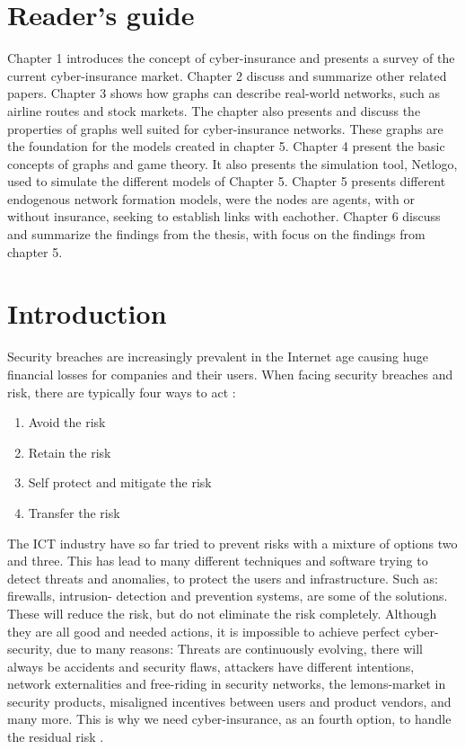 \section{Reader's guide}
Chapter 1 introduces the concept of cyber-insurance and presents a survey of the current cyber-insurance market. Chapter 2 discuss and summarize other related papers. Chapter 3 shows how graphs can describe real-world networks, such as airline routes and stock markets. The chapter also presents and discuss the properties of graphs well suited for cyber-insurance networks. These graphs are the foundation for the models created in chapter 5. Chapter 4 present the basic concepts of graphs and game theory. It also presents the simulation tool, Netlogo, used to simulate the different models of Chapter 5. 
Chapter 5 presents different endogenous network formation models, were the nodes are agents, with or without insurance, seeking to establish links with eachother.  
Chapter 6 discuss and summarize the findings from the thesis, with focus on the findings from chapter 5. 


\section{Introduction}
Security breaches are increasingly prevalent in the Internet age causing huge financial losses
for companies and their users. When facing security breaches and risk, there are typically four ways to act \cite{bolot2008new}:
\begin{enumerate}
\item Avoid the risk
\item Retain the risk
\item Self protect and mitigate the risk
\item Transfer the risk
\end{enumerate}
The ICT industry have so far tried to prevent risks with a mixture of options two and three. This has lead to many different techniques and software trying to detect threats and anomalies, to protect the users and infrastructure. Such as: firewalls, intrusion- detection and prevention systems, are some of the solutions. These will reduce the risk, but do not eliminate the risk completely. Although they are all good and needed actions, it is impossible to achieve perfect cyber-security, due to many reasons: Threats are continuously evolving, there will always be accidents and security flaws, attackers have different intentions, network externalities and free-riding in security networks, the lemons-market in security products, misaligned incentives between users and product vendors, and many more. 
This is why we need cyber-insurance, as an fourth option, to handle the residual risk \cite{lelarge2009economic,paldifferentiating}.

